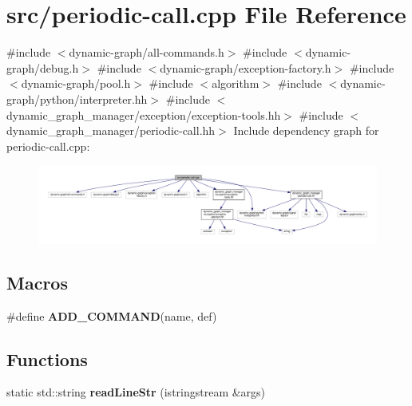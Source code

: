 \hypertarget{periodic-call_8cpp}{}\section{src/periodic-\/call.cpp File Reference}
\label{periodic-call_8cpp}
{\ttfamily \#include $<$dynamic-\/graph/all-\/commands.\+h$>$}\newline
{\ttfamily \#include $<$dynamic-\/graph/debug.\+h$>$}\newline
{\ttfamily \#include $<$dynamic-\/graph/exception-\/factory.\+h$>$}\newline
{\ttfamily \#include $<$dynamic-\/graph/pool.\+h$>$}\newline
{\ttfamily \#include $<$algorithm$>$}\newline
{\ttfamily \#include $<$dynamic-\/graph/python/interpreter.\+hh$>$}\newline
{\ttfamily \#include $<$dynamic\+\_\+graph\+\_\+manager/exception/exception-\/tools.\+hh$>$}\newline
{\ttfamily \#include $<$dynamic\+\_\+graph\+\_\+manager/periodic-\/call.\+hh$>$}\newline
Include dependency graph for periodic-\/call.cpp\+:
\nopagebreak
\begin{figure}[H]
\begin{center}
\leavevmode
\includegraphics[width=350pt]{periodic-call_8cpp__incl}
\end{center}
\end{figure}
\subsection*{Macros}
\begin{DoxyCompactItemize}
\item 
\#define {\bfseries A\+D\+D\+\_\+\+C\+O\+M\+M\+A\+ND}(name,  def)
\end{DoxyCompactItemize}
\subsection*{Functions}
\begin{DoxyCompactItemize}
\item 
\mbox{\label{periodic-call_8cpp_af4062bc26c8f63ecd9875f2dd95aac9c}} 
static std\+::string {\bfseries read\+Line\+Str} (istringstream \&args)
\end{DoxyCompactItemize}


